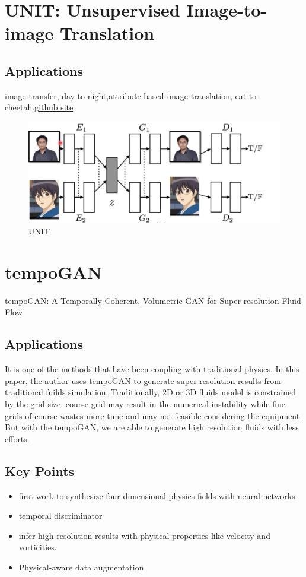 \documentclass{article}
\begin{document}
\section{UNIT: Unsupervised Image-to-image Translation}
\subsection{Applications}
image transfer, day-to-night,attribute based image translation, cat-to-cheetah.\href{https://github.com/mingyuliutw/UNIT}{github site}
\begin{figure}[H]
    \centering
    \includegraphics[width=\linewidth]{UNIT}
    \caption{UNIT}
\end{figure}
\section{tempoGAN}
\href{https://github.com/thunil/tempoGAN}{tempoGAN: A Temporally Coherent, Volumetric GAN for Super-resolution Fluid Flow}
\subsection{Applications}
It is one of the methods that have been coupling with traditional physics. In this paper, the author uses tempoGAN to generate super-resolution results from traditional fuilds simulation. Traditionally, 2D or 3D fluids model is constrained by the grid size. course grid may result in the numerical instability while fine grids of course wastes more time and may not feasible considering the equipment. But with the tempoGAN, we are able to generate high resolution fluids with less efforts.
\subsection{Key Points}
\begin{itemize}
\item first work to synthesize four-dimensional physics fields with neural networks
\item temporal discriminator
\item infer high resolution results with physical properties like velocity and vorticities.
\item Physical-aware data augmentation
\end{itemize}
\end{document}

